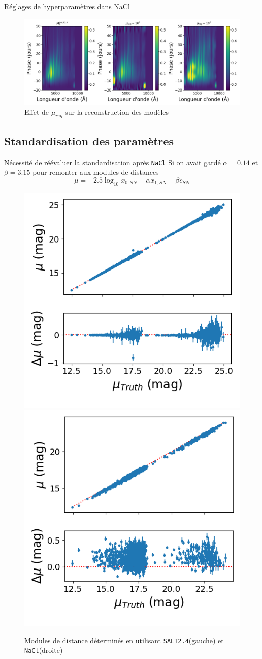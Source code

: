 \documentclass{beamer}
\def\nacl{\texttt{NaCl}\xspace}
\def\saltd{\texttt{SALT2.4}\xspace}
\begin{document}
\begin{frame}{Réglages de hyperparamètres dans NaCl}
\begin{figure}
	\centering
	\includegraphics[width=\textwidth]{figures/mu_reg_M0.png}
	\caption{Effet de $\mu_{reg}$ sur la reconstruction des modèles}
\end{figure}
\end{frame}

\subsection{Standardisation des paramètres}

\begin{frame}{Nécessité de réévaluer la standardisation après \nacl}
Si on avait gardé $\alpha=0.14$ et $\beta=3.15$ pour remonter aux modules de distances
\begin{equation}
	\mu = -2.5 \log_{10} x_{0, SN} - \alpha x_{1,SN} + \beta c_{SN}
\end{equation}
\begin{figure}
	\centering
	\includegraphics[width=.48\textwidth]{figures/salt_mu_new.png}
	\includegraphics[width=.48\textwidth]{figures/nacl_mu.png}
	\caption{Modules de distance déterminés en utilisant \saltd (gauche) et \nacl (droite)}
\end{figure}
\end{frame}
\end{document}
